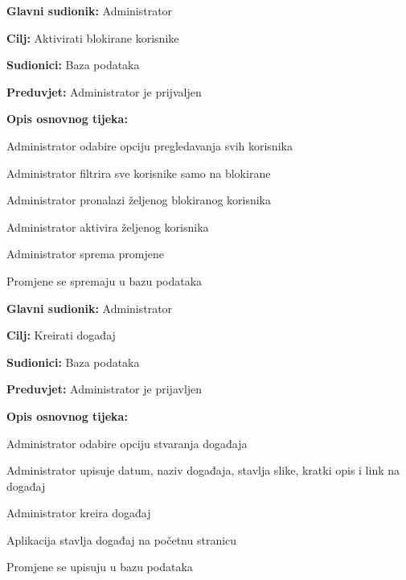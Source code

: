 				\noindent {}
					\begin{packed_item}
	
						\item \textbf{Glavni sudionik: }Administrator
						\item  \textbf{Cilj:} Aktivirati blokirane korisnike
						\item  \textbf{Sudionici:} Baza podataka
						\item  \textbf{Preduvjet:} Administrator je prijvaljen
						\item  \textbf{Opis osnovnog tijeka:}
						
						\item[] \begin{packed_enum}
	
							\item Administrator odabire opciju pregledavanja svih korisnika
							\item Administrator filtrira sve korisnike samo na blokirane
							\item Administrator pronalazi željenog blokiranog korisnika
							\item Administrator aktivira željenog korisnika
							\item Administrator sprema promjene
							\item Promjene se spremaju u bazu podataka

						\end{packed_enum}
					
					\end{packed_item}
					
				\noindent \underbar{\textbf{UC19 - Kreiraj događaj}}
					\begin{packed_item}
	
						\item \textbf{Glavni sudionik: }Administrator
						\item  \textbf{Cilj:} Kreirati događaj
						\item  \textbf{Sudionici:} Baza podataka
						\item  \textbf{Preduvjet:} Administrator je prijavljen
						\item  \textbf{Opis osnovnog tijeka:}
						
						\item[] \begin{packed_enum}
	
							\item Administrator odabire opciju stvaranja događaja
							\item Administrator upisuje datum, naziv događaja, stavlja slike, kratki opis i link na događaj
							\item Administrator kreira događaj
							\item Aplikacija stavlja događaj na početnu stranicu
							\item Promjene se upisuju u bazu podataka

						\end{packed_enum}	
					\end{packed_item}
					
